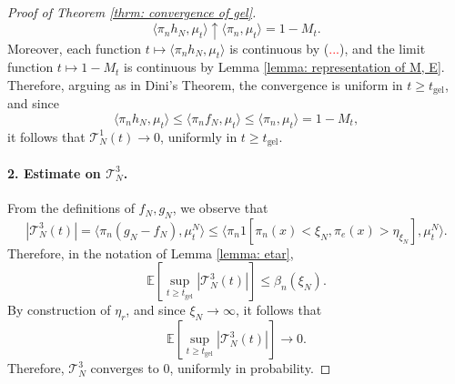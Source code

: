 \begin{proof}[Proof of Theorem \ref{thrm: convergence of gel}]
\begin{equation}
       \langle \pi_n h_N, \mu_t\rangle \uparrow \langle \pi_n, \mu_t\rangle =1-M_t.
   \end{equation} Moreover, each function $t\mapsto \langle \pi_n h_N, \mu_t\rangle$ is continuous by (\textcolor{red}{...}), and the limit function $t\mapsto 1-M_t$ is continuous by Lemma \ref{lemma: representation of M, E}. Therefore, arguing as in Dini's Theorem, the convergence is uniform in $t\geq t_\text{gel}$, and since \begin{equation}
       \langle \pi_n h_N, \mu_t\rangle \le \langle \pi_n f_N, \mu_t \rangle \le \langle \pi_n, \mu_t\rangle = 1-M_t, 
   \end{equation} it follows that $\mathcal{T}^1_N(t) \rightarrow 0$, uniformly in $t\geq t_\text{gel}$.
   \paragraph{2. Estimate on $\mathcal{T}^3_N$.} From the definitions of $f_N, g_N$, we observe that \begin{equation}
       |\mathcal{T}^3_N(t)|=\langle \pi_n(g_N-f_N), \mu^N_t\rangle \le  \langle \pi_n 1[\pi_n(x)<\xi_N, \pi_e(x)>\eta_{\xi_N}], \mu^N_t\rangle.
   \end{equation} Therefore, in the notation of Lemma \ref{lemma: etar}, \begin{equation}
       \mathbb{E}\left[\sup_{t\geq t_\text{gel}} |\mathcal{T}^3_N(t)|\right] \leq \beta_n(\xi_N).
   \end{equation} By construction of $\eta_r$, and since $\xi_N \rightarrow \infty$, it follows that \begin{equation}
       \mathbb{E}\left[\sup_{t\geq t_\text{gel}} |\mathcal{T}^3_N(t)|\right] \rightarrow 0.\end{equation} Therefore, $\mathcal{T}^3_N$ converges to $0$, uniformly in probability.

\end{proof}
